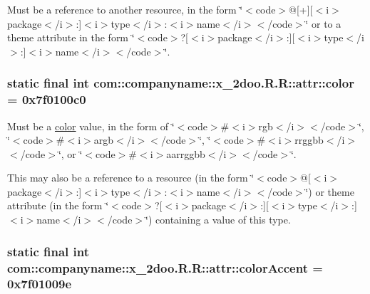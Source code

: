 Must be a reference to another resource, in the form \char`\"{}$<$code$>$@\mbox{[}+\mbox{]}\mbox{[}$<$i$>$package$<$/i$>$:\mbox{]}$<$i$>$type$<$/i$>$:$<$i$>$name$<$/i$>$$<$/code$>$\char`\"{} or to a theme attribute in the form \char`\"{}$<$code$>$?\mbox{[}$<$i$>$package$<$/i$>$:\mbox{]}\mbox{[}$<$i$>$type$<$/i$>$:\mbox{]}$<$i$>$name$<$/i$>$$<$/code$>$\char`\"{}. \hypertarget{classcom_1_1companyname_1_1x__2doo_1_1_r_1_1attr_3443d23802638e3da0e24ccb5744ca55}{
\subsubsection[{color}]{\setlength{\rightskip}{0pt plus 5cm}static final int com::companyname::x\_\-2doo.R.R::attr::color = 0x7f0100c0}}
\label{classcom_1_1companyname_1_1x__2doo_1_1_r_1_1attr_3443d23802638e3da0e24ccb5744ca55}


Must be a \hyperlink{classcom_1_1companyname_1_1x__2doo_1_1_r_1_1color}{color} value, in the form of \char`\"{}$<$code$>$\#$<$i$>$rgb$<$/i$>$$<$/code$>$\char`\"{}, \char`\"{}$<$code$>$\#$<$i$>$argb$<$/i$>$$<$/code$>$\char`\"{}, \char`\"{}$<$code$>$\#$<$i$>$rrggbb$<$/i$>$$<$/code$>$\char`\"{}, or \char`\"{}$<$code$>$\#$<$i$>$aarrggbb$<$/i$>$$<$/code$>$\char`\"{}. 

This may also be a reference to a resource (in the form \char`\"{}$<$code$>$@\mbox{[}$<$i$>$package$<$/i$>$:\mbox{]}$<$i$>$type$<$/i$>$:$<$i$>$name$<$/i$>$$<$/code$>$\char`\"{}) or theme attribute (in the form \char`\"{}$<$code$>$?\mbox{[}$<$i$>$package$<$/i$>$:\mbox{]}\mbox{[}$<$i$>$type$<$/i$>$:\mbox{]}$<$i$>$name$<$/i$>$$<$/code$>$\char`\"{}) containing a value of this type. \hypertarget{classcom_1_1companyname_1_1x__2doo_1_1_r_1_1attr_f2c20ce739e0c854987875661d3ff895}{
\subsubsection[{colorAccent}]{\setlength{\rightskip}{0pt plus 5cm}static final int com::companyname::x\_\-2doo.R.R::attr::colorAccent = 0x7f01009e}}
\label{classcom_1_1companyname_1_1x__2doo_1_1_r_1_1attr_f2c20ce739e0c854987875661d3ff895}



